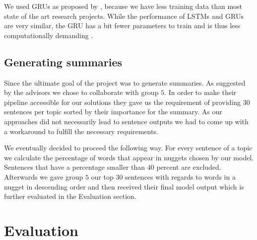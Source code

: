 \documentclass{article}
\begin{document}
We used GRUs as proposed by \citet{gru2014}, because we have less training data than most state of the art research projects. While the performance of LSTMs and GRUs are very similar, the GRU has a bit fewer parameters to train and is thus less computationally demanding \cite{cnn_rnn_comparative2017}.

\subsection{Generating summaries}
Since the ultimate goal of the project was to generate summaries. As suggested by the advisors we chose to collaborate with group $5$. In order to make their pipeline accessible for our solutions they gave us the requirement of providing 30 sentences per topic sorted by their importance for the summary. As our approaches did not necessarily lead to sentence outputs we had to come up with a workaround to fulfill the necessary requirements.  

We eventually decided to proceed the following way. For every sentence of a topic we calculate the percentage of words that appear in nuggets chosen by our model. Sentences that have a percentage smaller than $40$ percent are excluded. Afterwards we gave group $5$ our top $30$ sentences with regards to words in a nugget in descending order and then received their final model output which is further evaluated in the Evaluation section.   
\section{Evaluation}
\end{document}
